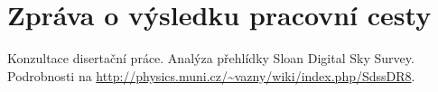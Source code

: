 \documentclass{article}
\begin{document}
\title{}
\author{Jaroslav Vážný}


\section*{Zpráva o výsledku pracovní cesty}

Konzultace  disertační práce. Analýza přehlídky Sloan Digital Sky
Survey. Podrobnosti na \url{http://physics.muni.cz/~vazny/wiki/index.php/SdssDR8}.


\end{document}

